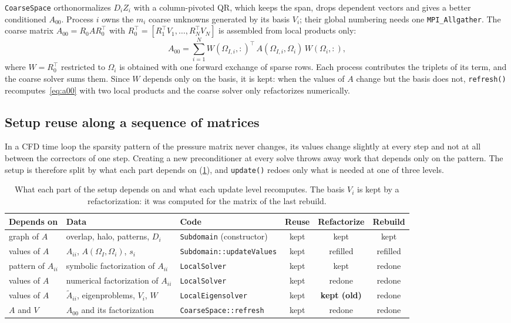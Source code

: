 \documentclass[11pt,a4paper]{article}
\newcommand{\At}{\widetilde{A}}
\begin{document}
\texttt{CoarseSpace} orthonormalizes $D_iZ_i$ with a column-pivoted QR, which keeps the span, drops dependent
vectors and gives a better conditioned $A_{00}$. Process $i$ owns the $m_i$ coarse unknowns generated by its
basis $V_i$; their global numbering needs one \texttt{MPI\_Allgather}. The coarse matrix
$A_{00}=R_0AR_0^\top$ with $R_0^\top=[R_1^\top V_1,\dots,R_N^\top V_N]$ is assembled from local products only:
\begin{equation}\label{eq:a00}
  A_{00} = \sum_{i=1}^{N} W(\Omega_{I,i},:)^\top\, A(\Omega_{I,i},\Omega_i)\, W(\Omega_i,:),
\end{equation}
where $W=R_0^\top$ restricted to $\Omega_i$ is obtained with one forward exchange of sparse rows. Each process
contributes the triplets of its term, and the coarse solver sums them. Since $W$ depends only on the basis, it
is kept: when the values of $A$ change but the basis does not, \texttt{refresh()} recomputes~\eqref{eq:a00}
with two local products and the coarse solver only refactorizes numerically.

\subsection{Setup reuse along a sequence of matrices}\label{sec:reuse}

In a CFD time loop the sparsity pattern of the pressure matrix never changes, its values change slightly at
every step and not at all between the correctors of one step. Creating a new preconditioner at every solve
throws away work that depends only on the pattern. The setup is therefore split by what each part depends on
(\cref{tab:reuse}), and \texttt{update()} redoes only what is needed at one of three levels.

\begin{table}[t]
\centering\small
\caption{What each part of the setup depends on and what each update level recomputes. The basis $V_i$ is
kept by a refactorization: it was computed for the matrix of the last rebuild.}\label{tab:reuse}
\setlength{\tabcolsep}{4pt}
\begin{tabularx}{\textwidth}{@{}l X l ccc@{}}
\toprule
Depends on & Data & Code & Reuse & Refactorize & Rebuild\\
\midrule
graph of $A$ & overlap, halo, patterns, $D_i$ & \texttt{Subdomain} (constructor) & kept & kept & kept\\
values of $A$ & $A_{ii}$, $A(\Omega_I,\Omega_i)$, $s_i$ & \texttt{Subdomain::updateValues} & kept & refilled & refilled\\
pattern of $A_{ii}$ & symbolic factorization of $A_{ii}$ & \texttt{LocalSolver} & kept & kept & redone\\
values of $A$ & numerical factorization of $A_{ii}$ & \texttt{LocalSolver} & kept & redone & redone\\
values of $A$ & $\At_{ii}$, eigenproblems, $V_i$, $W$ & \texttt{LocalEigensolver} & kept & \textbf{kept (old)} & redone\\
$A$ and $V$ & $A_{00}$ and its factorization & \texttt{CoarseSpace::refresh} & kept & redone & redone\\
\bottomrule
\end{tabularx}
\end{table}
\end{document}
